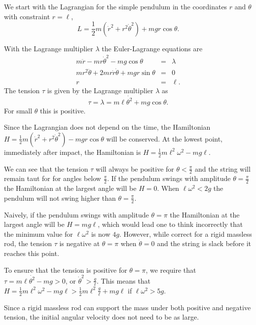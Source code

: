 \documentclass[letterpaper,11pt]{article}
\begin{document}
We start with the Lagrangian for the simple pendulum in the coordinates $r$ and $\theta$ with constraint $r = \ell$,
\begin{equation*}
 L = \frac{1}{2} m (\dot{r}^2 + r^2 \dot\theta^2) + m g r \cos\theta.
\end{equation*}

With the Lagrange multiplier $\lambda$ the Euler-Lagrange equations are
\begin{eqnarray*}
 m \ddot{r} - mr\dot{\theta}^2 - mg\cos\theta & = & \lambda \\
 m r^2 \ddot{\theta} + 2mr\dot{r}\dot{\theta} + mgr\sin\theta & = & 0 \\
 r & = & \ell.
\end{eqnarray*}
The tension $\tau$ is given by the Lagrange multiplier $\lambda$ as
\begin{equation*}
 \tau = \lambda = m \ell\dot{\theta^2} + mg\cos\theta.
\end{equation*}
For small $\theta$ this is positive.

Since the Lagrangian does not depend on the time, the Hamiltonian $H = \frac{1}{2} m (\dot{r}^2 + r^2 \dot\theta^2) - m g r \cos\theta$ will be conserved.  At the lowest point, immediately after impact, the Hamiltonian is $H = \frac{1}{2} m \ell^2 \omega^2 - m g \ell$.

We can see that the tension $\tau$ will always be positive for $\theta < \frac{\pi}{2}$ and the string will remain taut for for angles below $\frac{\pi}{2}$.  If the pendulum swings with amplitude $\theta = \frac{\pi}{2}$ the Hamiltonian at the largest angle will be $H = 0$.  When $\ell \omega^2 < 2 g$ the pendulum will not swing higher than $\theta = \frac{\pi}{2}$.

Naively, if the pendulum swings with amplitude $\theta = \pi$ the Hamiltonian at the largest angle will be $H = m g \ell$, which would lead one to think incorrectly that the minimum value for $\ell\omega^2$ is now $4 g$.  However, while correct for a rigid massless rod, the tension $\tau$ is negative at $\theta = \pi$ when $\dot{\theta} = 0$ and the string is slack before it reaches this point.

To ensure that the tension is positive for $\theta = \pi$, we require that $\tau = m \ell\dot{\theta^2} - mg > 0$, or $\dot{\theta}^2 > \frac{g}{\ell}$.  This means that $H = \frac{1}{2} m \ell^2 \omega^2 - m g \ell > \frac{1}{2} m \ell^2\frac{g}{\ell} + m g \ell$ if $\ell\omega^2 > 5 g$.

Since a rigid massless rod can support the mass under both positive and negative tension, the initial angular velocity does not need to be as large.
\end{document}
